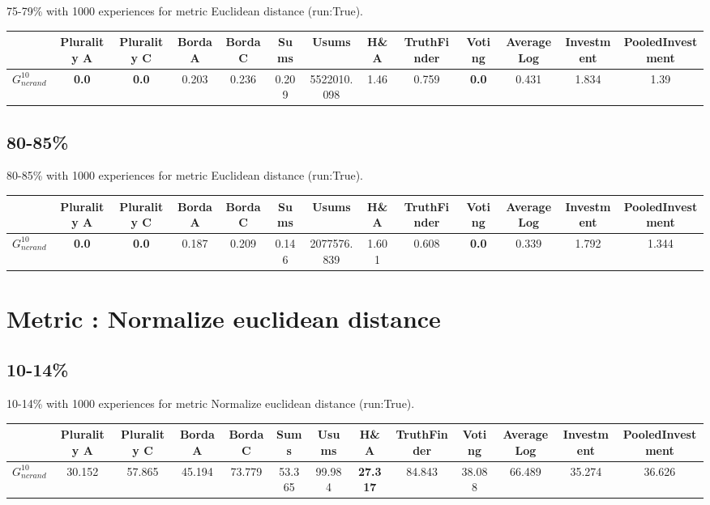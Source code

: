 \documentclass{article}
\newcommand{\graph}[2]{$G_{#1}^{#2}$}
\begin{document}
75-79\% with 1000 experiences for metric Euclidean distance (run:True).

\noindent\begin{tabular}{|l|c|c|c|c|c|c|c|c|c|c|c|c|}
\hline
& Plurality A& Plurality C& Borda A& Borda C& Sums& Usums& H\&A& TruthFinder& Voting& AverageLog& Investment& PooledInvestment\\
\hline
\graph{ncrand}{10} &\textbf{0.0}&\textbf{0.0}&0.203&0.236&0.209&5522010.098&1.46&0.759&\textbf{0.0}&0.431&1.834&1.39\\
\hline
\end{tabular}
\newpage

\subsection{80-85\%}

80-85\% with 1000 experiences for metric Euclidean distance (run:True).

\noindent\begin{tabular}{|l|c|c|c|c|c|c|c|c|c|c|c|c|}
\hline
& Plurality A& Plurality C& Borda A& Borda C& Sums& Usums& H\&A& TruthFinder& Voting& AverageLog& Investment& PooledInvestment\\
\hline
\graph{ncrand}{10} &\textbf{0.0}&\textbf{0.0}&0.187&0.209&0.146&2077576.839&1.601&0.608&\textbf{0.0}&0.339&1.792&1.344\\
\hline
\end{tabular}
\newpage
\newpage
\section{Metric : Normalize euclidean distance}

\newpage

\subsection{10-14\%}

10-14\% with 1000 experiences for metric Normalize euclidean distance (run:True).

\noindent\begin{tabular}{|l|c|c|c|c|c|c|c|c|c|c|c|c|}
\hline
& Plurality A& Plurality C& Borda A& Borda C& Sums& Usums& H\&A& TruthFinder& Voting& AverageLog& Investment& PooledInvestment\\
\hline
\graph{ncrand}{10} &30.152&57.865&45.194&73.779&53.365&99.984&\textbf{27.317}&84.843&38.088&66.489&35.274&36.626\\
\hline
\end{tabular}
\newpage
\end{document}
